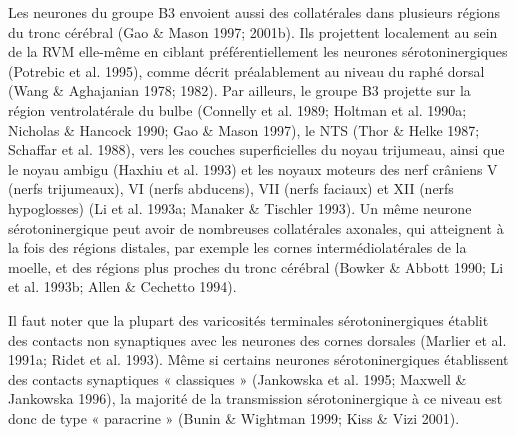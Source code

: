 \documentclass[a4paper,12pt,twoside]{report}
\begin{document}
Les neurones du groupe B3 envoient aussi des collatérales dans plusieurs régions du tronc cérébral (Gao \& Mason 1997; 2001b). Ils projettent localement au sein de la RVM elle-même en ciblant préférentiellement les neurones sérotoninergiques (Potrebic et al. 1995), comme décrit préalablement au niveau du raphé dorsal (Wang \& Aghajanian 1978; 1982). Par ailleurs, le groupe B3 projette sur la région ventrolatérale du bulbe (Connelly et al. 1989; Holtman et al. 1990a; Nicholas \& Hancock 1990; Gao \& Mason 1997), le NTS (Thor \& Helke 1987; Schaffar et al. 1988), vers les couches superficielles du noyau trijumeau, ainsi que le noyau ambigu (Haxhiu et al. 1993) et les noyaux moteurs des nerf crâniens V (nerfs trijumeaux), VI (nerfs abducens), VII (nerfs faciaux) et XII (nerfs hypoglosses) (Li et al. 1993a; Manaker \& Tischler 1993). Un même neurone sérotoninergique peut avoir de nombreuses collatérales axonales, qui atteignent à la fois des régions distales, par exemple les cornes intermédiolatérales de la moelle, et des régions plus proches du tronc cérébral (Bowker \& Abbott 1990; Li et al. 1993b; Allen \& Cechetto 1994). 

Il faut noter que la plupart des varicosités terminales sérotoninergiques établit des contacts non synaptiques avec les neurones des cornes dorsales (Marlier et al. 1991a; Ridet et al. 1993). Même si certains neurones sérotoninergiques établissent des contacts synaptiques « classiques » (Jankowska et al. 1995; Maxwell \& Jankowska 1996), la majorité de la transmission sérotoninergique à ce niveau est donc de type « paracrine » (Bunin \& Wightman 1999; Kiss \& Vizi 2001).
\end{document}
